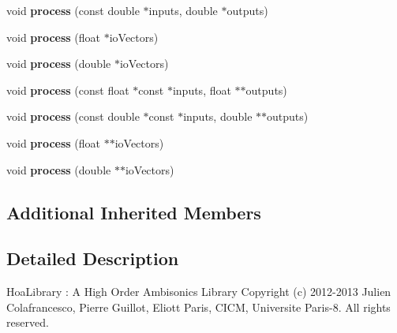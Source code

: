 \begin{DoxyCompactItemize}
\item 
\hypertarget{class_ambisonic_freeverb_a3bf00717d5692d2ef26cfa0e83001b63}{void {\bfseries process} (const double $\ast$inputs, double $\ast$outputs)}\label{class_ambisonic_freeverb_a3bf00717d5692d2ef26cfa0e83001b63}

\item 
\hypertarget{class_ambisonic_freeverb_a2f9bf07f2091071471f2f6803fd31fcb}{void {\bfseries process} (float $\ast$io\-Vectors)}\label{class_ambisonic_freeverb_a2f9bf07f2091071471f2f6803fd31fcb}

\item 
\hypertarget{class_ambisonic_freeverb_a0b1c001c27810780b802a34fe9fd206c}{void {\bfseries process} (double $\ast$io\-Vectors)}\label{class_ambisonic_freeverb_a0b1c001c27810780b802a34fe9fd206c}

\item 
\hypertarget{class_ambisonic_freeverb_acc58d029bd3c3b55cf9a13e2c164fae8}{void {\bfseries process} (const float $\ast$const $\ast$inputs, float $\ast$$\ast$outputs)}\label{class_ambisonic_freeverb_acc58d029bd3c3b55cf9a13e2c164fae8}

\item 
\hypertarget{class_ambisonic_freeverb_ae31f0e933fe2c4c7ab5982a83481a2d3}{void {\bfseries process} (const double $\ast$const $\ast$inputs, double $\ast$$\ast$outputs)}\label{class_ambisonic_freeverb_ae31f0e933fe2c4c7ab5982a83481a2d3}

\item 
\hypertarget{class_ambisonic_freeverb_af73fe573fd3a25e279ab14feb95070c7}{void {\bfseries process} (float $\ast$$\ast$io\-Vectors)}\label{class_ambisonic_freeverb_af73fe573fd3a25e279ab14feb95070c7}

\item 
\hypertarget{class_ambisonic_freeverb_a9e90790840fb793f779a3f2d985fbdfa}{void {\bfseries process} (double $\ast$$\ast$io\-Vectors)}\label{class_ambisonic_freeverb_a9e90790840fb793f779a3f2d985fbdfa}

\end{DoxyCompactItemize}
\subsection*{Additional Inherited Members}


\subsection{Detailed Description}
Hoa\-Library \-: A High Order Ambisonics Library Copyright (c) 2012-\/2013 Julien Colafrancesco, Pierre Guillot, Eliott Paris, C\-I\-C\-M, Universite Paris-\/8. All rights reserved.

